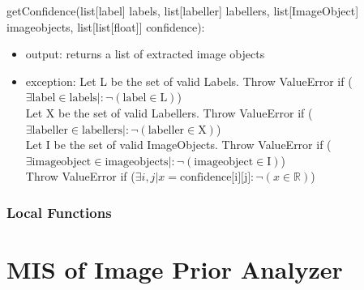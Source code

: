 \documentclass[12pt, titlepage]{article}
\begin{document}
  \noindent getConfidence(list[label] labels, list[labeller] labellers, list[ImageObject] imageobjects, list[list[float]] confidence):
  \begin{itemize}
  \item output: returns a list of extracted image objects
  \item exception: Let L be the set of valid Labels. Throw ValueError if ($\exists \text{label} \in \text{labels} |: \neg (\text{label} \in \text{L})$)\\
  Let X be the set of valid Labellers. Throw ValueError if ($\exists \text{labeller} \in \text{labellers} |: \neg (\text{labeller} \in \text{X})$)\\
  Let I be the set of valid ImageObjects. Throw ValueError if ($\exists \text{imageobject} \in \text{imageobjects} |: \neg (\text{imageobject} \in \text{I})$)\\
  Throw ValueError if ($\exists i,j| x = \text{confidence[i][j]} : \neg (x \in \mathbb{R})$)\\
  \end{itemize}


  
  
  
  \subsubsection{Local Functions}

   
  

\newpage



\section{MIS of Image Prior Analyzer }\label{image prior analyzer}
  
\end{document}
